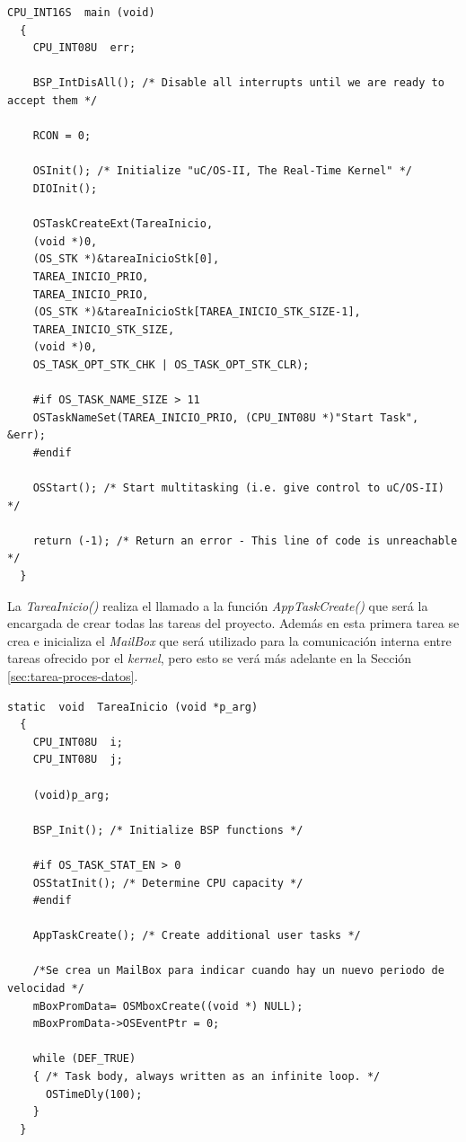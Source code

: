 \documentclass[11pt,a4paper,oneside]{article}
\begin{document}
\begin{lstlisting}[caption={Función principal del proyecto, \emph{main()}},label=code:main]
  CPU_INT16S  main (void)
  {
    CPU_INT08U  err;
    
    BSP_IntDisAll(); /* Disable all interrupts until we are ready to accept them */
    
    RCON = 0;
    
    OSInit(); /* Initialize "uC/OS-II, The Real-Time Kernel" */
    DIOInit();
    
    OSTaskCreateExt(TareaInicio,
    (void *)0,
    (OS_STK *)&tareaInicioStk[0],
    TAREA_INICIO_PRIO,
    TAREA_INICIO_PRIO,
    (OS_STK *)&tareaInicioStk[TAREA_INICIO_STK_SIZE-1],
    TAREA_INICIO_STK_SIZE,
    (void *)0,
    OS_TASK_OPT_STK_CHK | OS_TASK_OPT_STK_CLR);
    
    #if OS_TASK_NAME_SIZE > 11
    OSTaskNameSet(TAREA_INICIO_PRIO, (CPU_INT08U *)"Start Task", &err);
    #endif
    
    OSStart(); /* Start multitasking (i.e. give control to uC/OS-II) */
    
    return (-1); /* Return an error - This line of code is unreachable */
  }
\end{lstlisting}

La \emph{TareaInicio()} realiza el llamado a la función \emph{AppTaskCreate()} que será la encargada de crear todas las tareas del proyecto. Además en esta primera tarea se crea e inicializa el \emph{MailBox} que será utilizado para la comunicación interna entre tareas ofrecido por el \textsl{kernel}, pero esto se verá más adelante en la Sección \ref{sec:tarea-proces-datos}.

\begin{lstlisting}[caption={Función de la primer tarea creada, \emph{TareaInicio()}},label=code:tarea-inicio]
  static  void  TareaInicio (void *p_arg)
  {
    CPU_INT08U  i;
    CPU_INT08U  j;
    
    (void)p_arg;
    
    BSP_Init(); /* Initialize BSP functions */
    
    #if OS_TASK_STAT_EN > 0
    OSStatInit(); /* Determine CPU capacity */
    #endif
    
    AppTaskCreate(); /* Create additional user tasks */
    
    /*Se crea un MailBox para indicar cuando hay un nuevo periodo de velocidad */
    mBoxPromData= OSMboxCreate((void *) NULL);
    mBoxPromData->OSEventPtr = 0;
    
    while (DEF_TRUE) 
    { /* Task body, always written as an infinite loop. */
      OSTimeDly(100);
    }
  }
\end{lstlisting}
\end{document}
